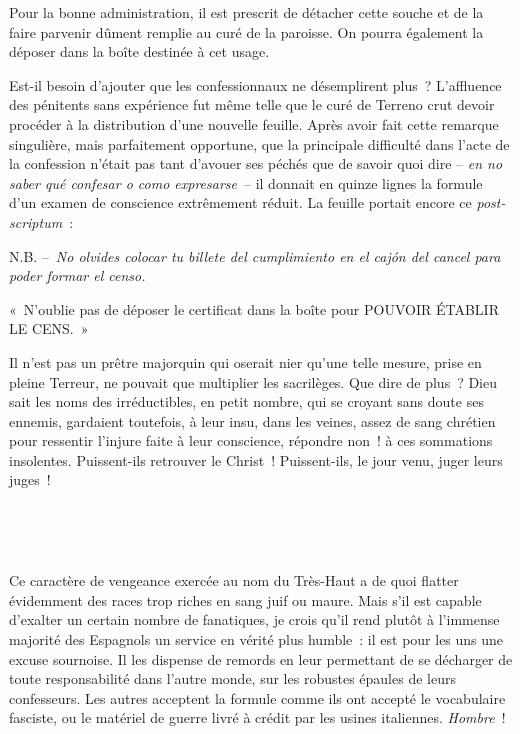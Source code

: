 \documentclass[french,twoside]{book} %
\newcommand{\astertri}{\medskip\par\centerline{\color{rubric}\large\selectfont{\syms ✻\,✻\,✻}}\medskip\par}%
\newenvironment{quoteblock}%
  {\begin{quoting}}
  {\end{quoting}}
\newenvironment{quotebar}{%
    \def\FrameCommand{{\color{rubric!10!}\vrule width 0.5em} \hspace{0.9em}}%
    \def\OuterFrameSep{\itemsep} %
    \MakeFramed {\advance\hsize-\width \FrameRestore}
  }%
  {%
    \endMakeFramed
  }
\renewenvironment{quoteblock}%
  {%
    \savenotes
    \setstretch{0.9}
    \normalfont
    \begin{quotebar}
  }
  {%
    \end{quotebar}
    \spewnotes
  }
\begin{document}
\begin{quoteblock}
 \noindent Pour la bonne administration, il est prescrit de détacher cette souche et de la faire parvenir dûment remplie au curé de la paroisse. On pourra également la déposer dans la boîte destinée à cet usage.
\end{quoteblock}

\noindent Est-il besoin d’ajouter que les confessionnaux ne désemplirent plus ? L’affluence des pénitents sans expérience fut même telle que le curé de Terreno crut devoir procéder à la distribution d’une nouvelle feuille. Après avoir fait cette remarque singulière, mais parfaitement opportune, que la principale difficulté dans l’acte de la confession n’était pas tant d’avouer ses péchés que de savoir quoi dire – \emph{en no saber qué confesar o como expresarse} – il donnait en quinze lignes la formule d’un examen de conscience extrêmement réduit. La feuille portait encore ce \emph{post-scriptum} :\par

\begin{quoteblock}
 \noindent N.B. – \emph{No olvides colocar tu billete del cumplimiento en el cajón del cancel para poder formar el censo.}\par
 « N’oublie pas de déposer le certificat dans la boîte pour POUVOIR ÉTABLIR LE CENS. »
\end{quoteblock}

\noindent Il n’est pas un prêtre majorquin qui oserait nier qu’une telle mesure, prise en pleine Terreur, ne pouvait que multiplier les sacrilèges. Que dire de plus ? Dieu sait les noms des irréductibles, en petit nombre, qui se croyant sans doute ses ennemis, gardaient toutefois, à leur insu, dans les veines, assez de sang chrétien pour ressentir l’injure faite à leur conscience, répondre non ! à ces sommations insolentes. Puissent-ils retrouver le Christ ! Puissent-ils, le jour venu, juger leurs juges !\par
 \par

\astertri

\noindent  \par
Ce caractère de vengeance exercée au nom du Très-Haut a de quoi flatter évidemment des races trop riches en sang juif ou maure. Mais s’il est capable d’exalter un certain nombre de fanatiques, je crois qu’il rend plutôt à l’immense majorité des Espagnols un service en vérité plus humble : il est pour les uns une excuse sournoise. Il les dispense de remords en leur permettant de se décharger de toute responsabilité dans l’autre monde, sur les robustes épaules de leurs confesseurs. Les autres acceptent la formule comme ils ont accepté le vocabulaire fasciste, ou le matériel de guerre livré à crédit par les usines italiennes. \emph{Hombre} !\par
 \par
\end{document}

